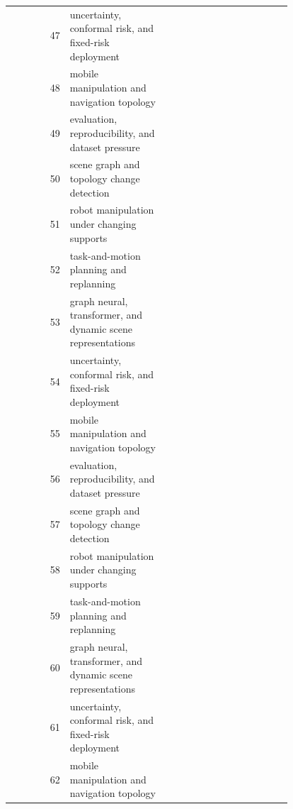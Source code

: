 \documentclass{article}
\begin{document}
\begin{longtable}{r p{0.34\linewidth} p{0.45\linewidth}}
47 & uncertainty, conformal risk, and fixed-risk deployment & \citep{ge2026dgsgmind139,jemin2025an140,ramanishka2018toward141} \\
48 & mobile manipulation and navigation topology & \citep{chidi2024exploring142,wu2018ga143,glocker2025llmempowered144} \\
49 & evaluation, reproducibility, and dataset pressure & \citep{reardon2024augmented145,padala2018a146,berg2005using147} \\
50 & scene graph and topology change detection & \citep{xia2024monosaid148,aljarrah2018a149,shahoud2021detection150} \\
51 & robot manipulation under changing supports & \citep{fan2024embodied151,chowdhuryan2025graph152,li2025enhancing153} \\
52 & task-and-motion planning and replanning & \citep{pasupuleti20253d154,xu2025tbhsu155,soylu2026multidecnet156} \\
53 & graph neural, transformer, and dynamic scene representations & \citep{zhang2025application157,tang2024mobile158,kelley2008understanding159} \\
54 & uncertainty, conformal risk, and fixed-risk deployment & \citep{cheng2024vision160,ivan2013topologybased161,dingndagentsgrasp162} \\
55 & mobile manipulation and navigation topology & \citep{shi2009moving163,ref2009the164,greene2010rapid165} \\
56 & evaluation, reproducibility, and dataset pressure & \citep{yang1995path166,fan2022visionbased167,chalvatzaki2023learning168} \\
57 & scene graph and topology change detection & \citep{cao2023scenegate169,ananthi2024change170,grattarola2020change171} \\
58 & robot manipulation under changing supports & \citep{albert2002detection172,wahby2019collective173,kim2019video174} \\
59 & task-and-motion planning and replanning & \citep{funfgeld2014frame175,khelifi2020deep176,baba2002collision177} \\
60 & graph neural, transformer, and dynamic scene representations & \citep{tang2024outdoor178,dai2021image179,elwaly2024new180} \\
61 & uncertainty, conformal risk, and fixed-risk deployment & \citep{fan2023advances181,jahanshahi2012adaptive182,zhang2025multiscene183} \\
62 & mobile manipulation and navigation topology & \citep{chen2025hierarchical184,liu2023path185,wang2024riskaware186} \\

\end{longtable}
\end{document}
